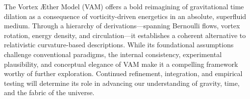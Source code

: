 The Vortex Æther Model (VAM) offers a bold reimagining of gravitational time dilation as a consequence of vorticity-driven energetics in an absolute, superfluid medium. Through a hierarchy of derivations—spanning Bernoulli flows, vortex rotation, energy density, and circulation—it establishes a coherent alternative to relativistic curvature-based descriptions. While its foundational assumptions challenge conventional paradigms, the internal consistency, experimental plausibility, and conceptual elegance of VAM make it a compelling framework worthy of further exploration. Continued refinement, integration, and empirical testing will determine its role in advancing our understanding of gravity, time, and the fabric of the universe.
